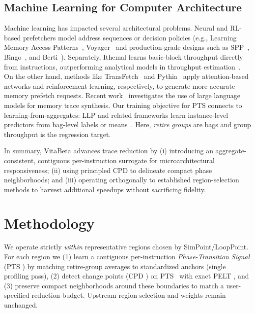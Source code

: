 \documentclass[conference]{IEEEtran}
\newcommand{\pts}{\textsc{PTS} }
\newcommand{\cpd}{\textsc{CPD} }
\newcommand{\pelt}{\textsc{PELT} }
\begin{document}
\subsection{Machine Learning for Computer Architecture}
Machine learning has impacted several architectural problems. Neural and RL-based prefetchers model address sequences or decision policies (e.g., Learning Memory Access Patterns~\cite{hashemi2018learning}, Voyager~\cite{voyager-asplos21} and production-grade designs such as SPP~\cite{spp-micro16}, Bingo~\cite{bingo-hpca19}, and Berti~\cite{berti-micro22}). Separately, Ithemal learns basic-block throughput directly from instructions, outperforming analytical models in throughput estimation~\cite{pmlr-v97-mendis19a}. 
On the other hand, methods like TransFetch~\cite{transfetch} and Pythia~\cite{pythia} apply attention-based networks and reinforcement learning, respectively, to generate more accurate memory prefetch requests. Recent work~\cite{mine} investigates the use of large language models for memory trace synthesis.
Our training objective for \pts connects to learning-from-aggregates: LLP and related frameworks learn instance-level predictors from bag-level labels or means~\cite{yu2014-llp,scott2020-llp,law2018-agg,zhang2020-agg}. Here, \emph{retire groups} are bags and group throughput is the regression target.
 


In summary, VitaBeta advances trace reduction by (i) introducing an aggregate-consistent, contiguous per-instruction surrogate for microarchitectural responsiveness; (ii) using principled CPD to delineate compact phase neighborhoods; and (iii) operating orthogonally to established region-selection methods to harvest additional speedups without sacrificing fidelity.

 




\section{Methodology}
\label{sec:methodology}

We operate strictly \emph{within} representative regions chosen by SimPoint/LoopPoint. For each region we (1) learn a contiguous per-instruction \emph{Phase-Transition Signal} (\pts) by matching retire-group averages to standardized anchors (single profiling pass), (2) detect change points (\cpd) on \pts\ with exact \pelt, and (3) preserve compact neighborhoods around these boundaries to match a user-specified reduction budget. Upstream region selection and weights remain unchanged.
\end{document}
